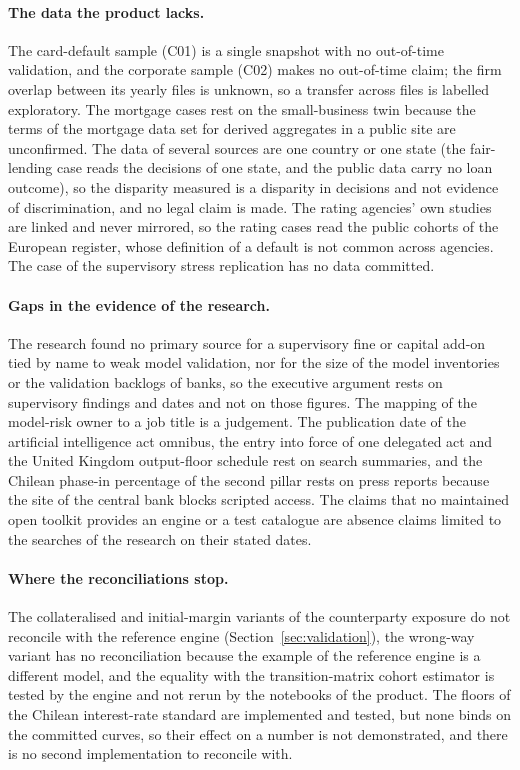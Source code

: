 \paragraph{The data the product lacks.} The card-default sample (C01) is a single snapshot with no out-of-time validation, and the corporate sample (C02) makes no out-of-time claim; the firm overlap between its yearly files is unknown, so a transfer across files is labelled exploratory. The mortgage cases rest on the small-business twin because the terms of the mortgage data set for derived aggregates in a public site are unconfirmed. The data of several sources are one country or one state (the fair-lending case reads the decisions of one state, and the public data carry no loan outcome), so the disparity measured is a disparity in decisions and not evidence of discrimination, and no legal claim is made. The rating agencies' own studies are linked and never mirrored, so the rating cases read the public cohorts of the European register, whose definition of a default is not common across agencies. The case of the supervisory stress replication has no data committed.

\paragraph{Gaps in the evidence of the research.} The research found no primary source for a supervisory fine or capital add-on tied by name to weak model validation, nor for the size of the model inventories or the validation backlogs of banks, so the executive argument rests on supervisory findings and dates and not on those figures. The mapping of the model-risk owner to a job title is a judgement. The publication date of the artificial intelligence act omnibus, the entry into force of one delegated act and the United Kingdom output-floor schedule rest on search summaries, and the Chilean phase-in percentage of the second pillar rests on press reports because the site of the central bank blocks scripted access. The claims that no maintained open toolkit provides an engine or a test catalogue are absence claims limited to the searches of the research on their stated dates.

\paragraph{Where the reconciliations stop.} The collateralised and initial-margin variants of the counterparty exposure do not reconcile with the reference engine (Section~\ref{sec:validation}), the wrong-way variant has no reconciliation because the example of the reference engine is a different model, and the equality with the transition-matrix cohort estimator is tested by the engine and not rerun by the notebooks of the product. The floors of the Chilean interest-rate standard are implemented and tested, but none binds on the committed curves, so their effect on a number is not demonstrated, and there is no second implementation to reconcile with.

